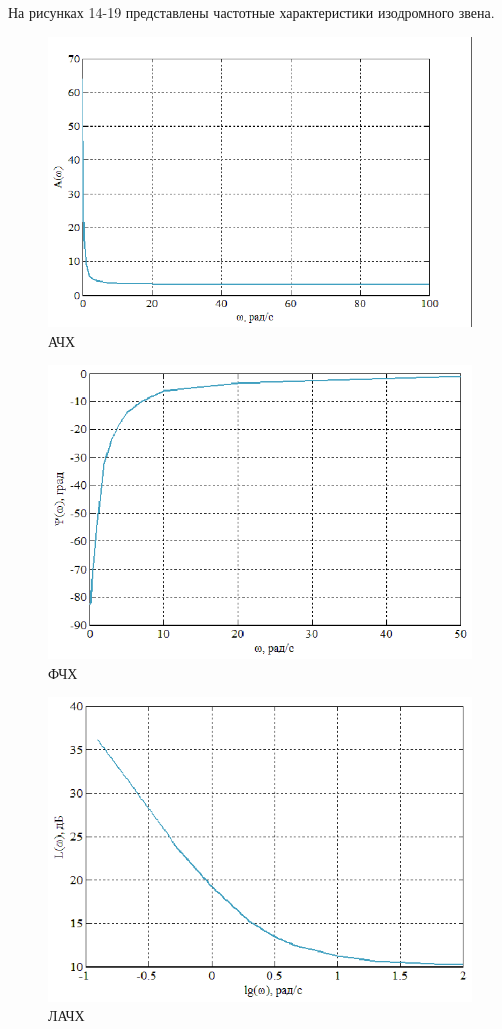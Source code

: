 \documentclass[a4paper,12pt]{article} %
\begin{document}
На рисунках 14-19 представлены частотные характеристики изодромного звена.
\begin{figure}[H]
	\centering
	\includegraphics[width=1\linewidth]{scheme/Ach3.eps}
	\caption{АЧХ}
\end{figure}
\begin{figure}[H]
	\centering
	\includegraphics[width=1\linewidth]{scheme/Fch3.eps}
	\caption{ФЧХ}
\end{figure}
\begin{figure}[H]
	\centering
	\includegraphics[width=1\linewidth]{scheme/Lach3.eps}
	\caption{ЛАЧХ}
\end{figure}
\end{document}
